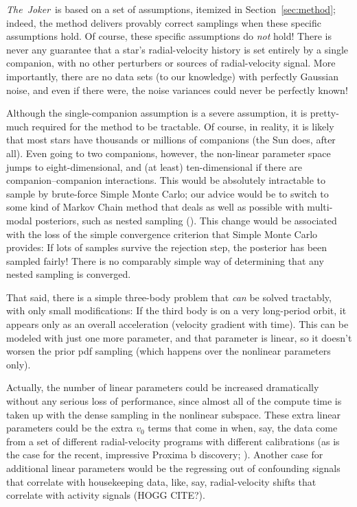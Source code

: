 \documentclass[manuscript, letterpaper]{aastex6}
\newcommand{\project}[1]{\textsl{#1}}
\newcommand{\samplername}{\project{The~Joker}}
\newcommand{\sectionname}{Section}
\begin{document}
\samplername\ is based on a set of assumptions, itemized in
\sectionname~\ref{sec:method}; indeed, the method delivers provably
correct samplings when these specific assumptions hold.
Of course, these specific assumptions do \emph{not} hold!
There is never any guarantee that a star's radial-velocity history
is set entirely by a single companion, with no other perturbers or
sources of radial-velocity signal.
More importantly, there are no data sets (to our knowledge) with
perfectly Gaussian noise, and even if there were, the noise variances
could never be perfectly known!

Although the single-companion assumption is a severe assumption, it
is pretty-much required for the method to be tractable.
Of course, in reality, it is likely that most stars have thousands or
millions of companions (the Sun does, after all).
Even going to two companions, however, the non-linear parameter space
jumps to eight-dimensional, and (at least) ten-dimensional if there
are companion--companion interactions.
This would be absolutely intractable to sample by brute-force Simple
Monte Carlo; our advice would be to switch to some kind of Markov
Chain method that deals as well as possible with multi-modal
posteriors, such as nested sampling (\citealt{skilling, brewer}).
This change would be associated with the loss of the simple
convergence criterion that Simple Monte Carlo provides: If lots of
samples survive the rejection step, the posterior has been sampled
fairly!
There is no comparably simple way of determining that any nested
sampling is converged.

That said, there is a simple three-body problem that \emph{can} be
solved tractably, with only small modifications:
If the third body is on a very long-period orbit, it appears only
as an overall acceleration (velocity gradient with time).
This can be modeled with just one more parameter, and that parameter
is linear, so it doesn't worsen the prior pdf sampling (which happens
over the nonlinear parameters only).

Actually, the number of linear parameters could be increased
dramatically without any serious loss of performance, since almost all
of the compute time is taken up with the dense sampling in the nonlinear
subspace.
These extra linear parameters could be the extra $v_0$ terms that come
in when, say, the data come from a set of different radial-velocity
programs with different calibrations (as is the case for the recent,
impressive Proxima b discovery; \citealt{proximab}).
Another case for additional linear parameters would be the regressing
out of confounding signals that correlate with housekeeping data,
like, say, radial-velocity shifts that correlate with activity signals
(HOGG CITE?).
\end{document}
